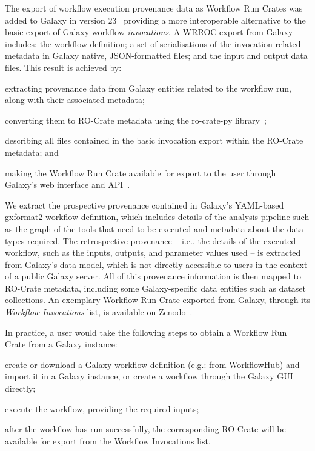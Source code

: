 \documentclass[10pt,letterpaper]{article}
\begin{document}
The export of workflow execution provenance data as Workflow Run Crates was added to Galaxy in version 23~\cite{Galaxy 2023} providing a more interoperable alternative to the basic export of Galaxy workflow
\emph{invocations}. A WRROC export from Galaxy includes: the workflow definition; a set of serialisations of the invocation-related metadata in Galaxy native, JSON-formatted files;
and the input and output data files.
This result is achieved by:
\begin{inlineenum}
\item extracting provenance data from Galaxy entities related to the workflow run, along with their associated metadata;
\item converting them to RO-Crate metadata using the ro-crate-py library~\cite{ro-crate-py};
\item describing all files contained in the basic invocation export within the RO-Crate metadata; and
\item making the Workflow Run Crate available for export to the user through Galaxy's web interface and API~\cite{De Geest 2022b}.
\end{inlineenum}
We extract the prospective provenance contained in Galaxy's YAML-based gxformat2
\cite{gxformat2} workflow definition, which includes details of the analysis pipeline such as the graph of the tools that need to be executed and metadata about the data types required.
The retrospective provenance -- i.e., the details of the executed workflow, such as the inputs, outputs, and parameter values used -- is extracted from Galaxy's data model,
which is not directly accessible to users in the context of a public Galaxy server.
All of this provenance information is then mapped to RO-Crate metadata, including some Galaxy-specific data entities such as dataset collections.
An exemplary Workflow Run Crate exported from Galaxy, through its \emph{Workflow Invocations} list, is available on Zenodo~\cite{De Geest 2023}.

In practice, a user would take the following steps to obtain a Workflow Run Crate from a Galaxy instance:
\begin{inlineenum}
\item create or download a Galaxy workflow definition (e.g.: from WorkflowHub) and import it in a Galaxy instance, or create a workflow through the Galaxy GUI directly;
\item execute the workflow, providing the required inputs;
\item after the workflow has run successfully, the corresponding RO-Crate will be available for export from the Workflow Invocations list.
\end{inlineenum}
\end{document}
